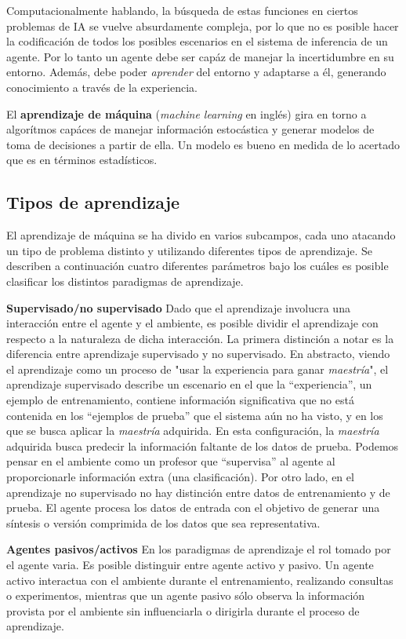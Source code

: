 Computacionalmente hablando, la búsqueda de estas funciones en ciertos problemas de IA
se vuelve absurdamente compleja, por lo que no es posible hacer la codificación de todos
los posibles escenarios en el sistema de inferencia de un agente. Por lo tanto un agente
debe ser capáz de manejar la incertidumbre en su entorno. Además, debe poder \textit{aprender}
del entorno y adaptarse a él, generando conocimiento a través de la experiencia.

El \textbf{aprendizaje de máquina} (\textit{machine learning} en inglés) gira en torno a
algorítmos capáces de manejar información estocástica y generar modelos de toma de decisiones
a partir de ella. Un modelo es bueno en medida de lo acertado que es en términos estadísticos.

\subsection{Tipos de aprendizaje}
El aprendizaje de máquina se ha divido en varios subcampos,
cada uno atacando un tipo de problema distinto y utilizando diferentes
tipos de aprendizaje.
Se describen a continuación cuatro diferentes parámetros bajo los cuáles
es posible clasificar los distintos paradigmas de aprendizaje.

\textbf{Supervisado/no supervisado} Dado que el aprendizaje involucra
una interacción entre el agente y el ambiente, es posible
dividir el aprendizaje con respecto a la naturaleza de dicha interacción.
La primera distinción a notar es la diferencia entre aprendizaje supervisado
y no supervisado. En abstracto, viendo el aprendizaje como un proceso
de "usar la experiencia para ganar \textit{maestría}", el aprendizaje
supervisado describe un escenario en el que la ``experiencia'', un
ejemplo de entrenamiento, contiene información significativa que no
está contenida en los ``ejemplos de prueba'' que el sistema aún no ha
visto, y en los que se busca aplicar la \textit{maestría} adquirida.
En esta configuración, la \textit{maestría} adquirida busca
predecir la información faltante de los datos de prueba. Podemos
pensar en el ambiente como un profesor que ``supervisa'' al agente
al proporcionarle información extra (una clasificación). Por otro lado,
en el aprendizaje no supervisado no hay distinción entre datos de
entrenamiento y de prueba. El agente procesa los datos de entrada
con el objetivo de generar una síntesis o versión comprimida de los
datos que sea representativa.

\textbf{Agentes pasivos/activos} En los paradigmas de aprendizaje
el rol tomado por el agente varia. Es posible distinguir entre
agente activo y pasivo. Un agente activo interactua
con el ambiente durante el entrenamiento, realizando consultas o
experimentos, mientras que un agente pasivo sólo observa la
información provista por el ambiente sin influenciarla
o dirigirla durante el proceso de aprendizaje.

